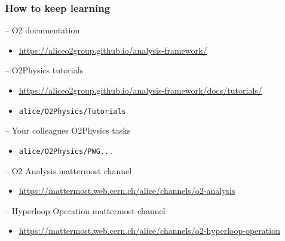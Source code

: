 \documentclass[14pt,aspectratio=169,t]{beamer}
\begin{document}
\begin{frame}
  \frametitle{How to keep learning}
  \small
  -- {\color{blue} O2 documentation}\par
  \begin{itemize}
    \vspace{-0.1in}
    \item \href{https://aliceo2group.github.io/analysis-framework/}{https://aliceo2group.github.io/analysis-framework/}
  \end{itemize}
  -- {\color{blue} O2Physics tutorials} 
  \begin{itemize}
    \vspace{-0.1in}
    \item \href{https://aliceo2group.github.io/analysis-framework/docs/tutorials/}{https://aliceo2group.github.io/analysis-framework/docs/tutorials/}
    \vspace{-0.1in}
    \item \texttt{alice/O2Physics/Tutorials}
  \end{itemize}
  -- {\color{blue} Your colleagues O2Physics tasks} 
  \begin{itemize}
    \vspace{-0.1in}
    \item \texttt{alice/O2Physics/PWG...}
  \end{itemize}
  -- {\color{blue} O2 Analysis mattermost channel}\par
  \begin{itemize}
    \vspace{-0.1in}
    \item \href{https://mattermost.web.cern.ch/alice/channels/o2-analysis}{https://mattermost.web.cern.ch/alice/channels/o2-analysis}
  \end{itemize}
  -- {\color{blue} Hyperloop Operation mattermost channel}\par
  \begin{itemize}
    \vspace{-0.1in}
    \item \href{https://mattermost.web.cern.ch/alice/channels/o2-hyperloop-operation}{https://mattermost.web.cern.ch/alice/channels/o2-hyperloop-operation}
  \end{itemize}
\end{frame}
\end{document}
